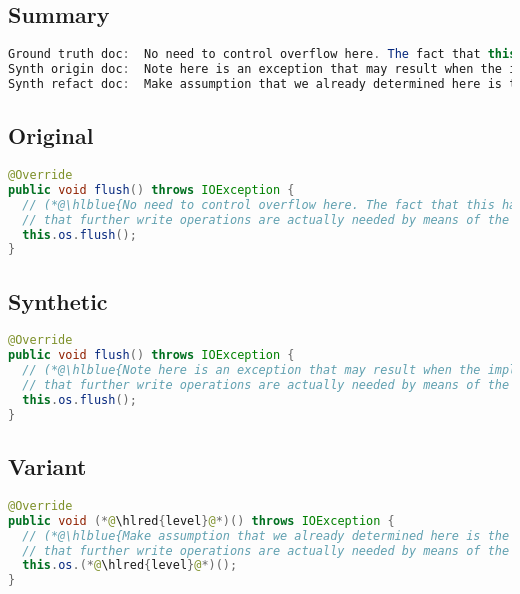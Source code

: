 \documentclass[11pt]{article}
\DeclareRobustCommand{\hlred}[1]{{\sethlcolor{YellowOrange}\hl{#1}}}
\DeclareRobustCommand{\hlblue}[1]{{\sethlcolor{SeaGreen}\hl{#1}}}
\DeclareRobustCommand{\hlblue}[1]{{\sethlcolor{SkyBlue}\hl{#1}}}
\begin{document}
\subsection{Summary}

\begin{lstlisting}[language=java]
Ground truth doc:  No need to control overflow here. The fact that this has overflow will be used as a flag to determine
Synth origin doc:  Note here is an exception that may result when the implementation checks whether and if the operation succeeds to
Synth refact doc:  Make assumption that we already determined here is the caller of it and also know now we already determine
\end{lstlisting}

\subsection{Original}
\begin{lstlisting}[language=java]
@Override
public void flush() throws IOException {
  // (*@\hlblue{No need to control overflow here. The fact that this has overflow will be used as a flag to determine}@*)
  // that further write operations are actually needed by means of the isOverflown() method.
  this.os.flush();
}
\end{lstlisting}
\subsection{Synthetic}

\begin{lstlisting}[language=java]
@Override
public void flush() throws IOException {
  // (*@\hlblue{Note here is an exception that may result when the implementation checks whether and if the operation succeeds to}@*)
  // that further write operations are actually needed by means of the isOverflown() method.
  this.os.flush();
}
\end{lstlisting}

\subsection{Variant}

\begin{lstlisting}[language=java]
@Override
public void (*@\hlred{level}@*)() throws IOException {
  // (*@\hlblue{Make assumption that we already determined here is the caller of it and also know now we already determine}@*)
  // that further write operations are actually needed by means of the isOverflown() method.
  this.os.(*@\hlred{level}@*)();
}
\end{lstlisting}
\end{document}
